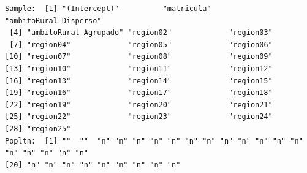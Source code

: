 \documentclass[
  spanish,
  a4paper,
]{scrreprt}
\begin{document}
\begin{verbatim}
Sample:  [1] "(Intercept)"          "matricula"            "ambitoRural Disperso"
 [4] "ambitoRural Agrupado" "region02"             "region03"            
 [7] "region04"             "region05"             "region06"            
[10] "region07"             "region08"             "region09"            
[13] "region10"             "region11"             "region12"            
[16] "region13"             "region14"             "region15"            
[19] "region16"             "region17"             "region18"            
[22] "region19"             "region20"             "region21"            
[25] "region22"             "region23"             "region24"            
[28] "region25"            
Popltn:  [1] ""  ""  "n" "n" "n" "n" "n" "n" "n" "n" "n" "n" "n" "n" "n" "n" "n" "n" "n"
[20] "n" "n" "n" "n" "n" "n" "n" "n" "n"
\end{verbatim}
\end{document}
